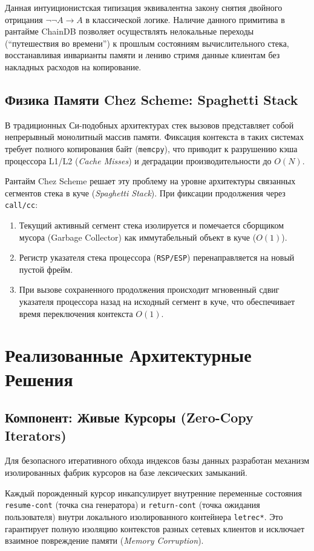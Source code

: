 \documentclass[12pt,a4paper]{article}
\begin{document}
Данная интуиционистская типизация эквивалентна закону снятия двойного отрицания $\neg\neg A \to A$ в классической логике. Наличие данного примитива в рантайме ChainDB позволяет осуществлять нелокальные переходы (``путешествия во времени'') к прошлым состояниям вычислительного стека, восстанавливая инварианты памяти и лениво стримя данные клиентам без накладных расходов на копирование.

\subsection{Физика Памяти Chez Scheme: Spaghetti Stack}
В традиционных Си-подобных архитектурах стек вызовов представляет собой непрерывный монолитный массив памяти. Фиксация контекста в таких системах требует полного копирования байт (\texttt{memcpy}), что приводит к разрушению кэша процессора L1/L2 (\textit{Cache Misses}) и деградации производительности до $O(N)$.

Рантайм Chez Scheme решает эту проблему на уровне архитектуры связанных сегментов стека в куче (\textit{Spaghetti Stack}). При фиксации продолжения через \texttt{call/cc}:
\begin{enumerate}
    \item Текущий активный сегмент стека изолируется и помечается сборщиком мусора (Garbage Collector) как иммутабельный объект в куче ($O(1)$).
    \item Регистр указателя стека процессора (\texttt{RSP/ESP}) перенаправляется на новый пустой фрейм.
    \item При вызове сохраненного продолжения происходит мгновенный сдвиг указателя процессора назад на исходный сегмент в куче, что обеспечивает время переключения контекста $O(1)$.
\end{enumerate}

\section{Реализованные Архитектурные Решения}

\subsection{Компонент: Живые Курсоры (Zero-Copy Iterators)}
Для безопасного итеративного обхода индексов базы данных разработан механизм изолированных фабрик курсоров на базе лексических замыканий. 

Каждый порожденный курсор инкапсулирует внутренние переменные состояния \texttt{resume-cont} (точка сна генератора) и \texttt{return-cont} (точка ожидания пользователя) внутри локального изолированного контейнера \texttt{letrec*}. Это гарантирует полную изоляцию контекстов разных сетевых клиентов и исключает взаимное повреждение памяти (\textit{Memory Corruption}). 
\end{document}
